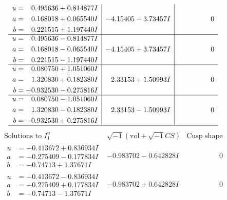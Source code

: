 \documentclass[1p]{elsarticle_modified}
\theoremstyle{definition}
\newcommand{\I}{\sqrt{-1}}
\begin{document}
$$\begin{array}{c|c|c}
\begin{aligned}
u &= \phantom{-}0.495636 + 0.814877 I \\
a &= \phantom{-}0.168018 + 0.065540 I \\
b &= \phantom{-}0.221515 + 1.197440 I\end{aligned}
 & -4.15405 - 3.73457 I & \phantom{-0.000000 } 0 \\ \hline\begin{aligned}
u &= \phantom{-}0.495636 - 0.814877 I \\
a &= \phantom{-}0.168018 - 0.065540 I \\
b &= \phantom{-}0.221515 - 1.197440 I\end{aligned}
 & -4.15405 + 3.73457 I & \phantom{-0.000000 } 0 \\ \hline\begin{aligned}
u &= \phantom{-}0.080750 + 1.051060 I \\
a &= \phantom{-}1.320830 + 0.182380 I \\
b &= -0.932530 - 0.275816 I\end{aligned}
 & \phantom{-}2.33153 + 1.50993 I & \phantom{-0.000000 } 0 \\ \hline\begin{aligned}
u &= \phantom{-}0.080750 - 1.051060 I \\
a &= \phantom{-}1.320830 - 0.182380 I \\
b &= -0.932530 + 0.275816 I\end{aligned}
 & \phantom{-}2.33153 - 1.50993 I & \phantom{-0.000000 } 0\\
 \hline 
 \end{array}$$\newpage$$\begin{array}{c|c|c}  
\text{Solutions to }I^u_{1}& \I (\text{vol} + \sqrt{-1}CS) & \text{Cusp shape}\\
 \hline 
\begin{aligned}
u &= -0.413672 + 0.836934 I \\
a &= -0.275409 - 0.177834 I \\
b &= -0.74713 + 1.37671 I\end{aligned}
 & -0.983702 - 0.642828 I & \phantom{-0.000000 } 0 \\ \hline\begin{aligned}
u &= -0.413672 - 0.836934 I \\
a &= -0.275409 + 0.177834 I \\
b &= -0.74713 - 1.37671 I\end{aligned}
 & -0.983702 + 0.642828 I & \phantom{-0.000000 } 0 \\ \hline\begin{aligned}

\end{aligned}
\end{array}$$
\end{document}
